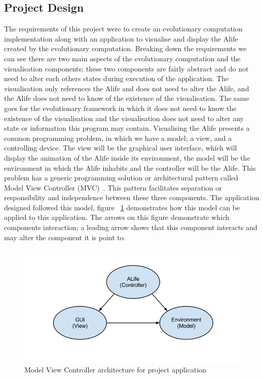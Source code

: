 \documentclass[12pt]{article}
\begin{document}
\subsection{Project Design}
The requirements of this project were to create an evolutionary computation implementation along with an application to visualise and
display the Alife created by the evolutionary computation. Breaking down the requirements we can see there are two main aspects
of the evolutionary computation and the visualisation components; these two components are fairly abstract and do not need to alter
each others states during execution of the application. The visualisation only references the Alife and does not need to alter
the Alife, and the Alife does not need to know of the existence of the visualisation. The same goes for the evolutionary framework
in which it does not need to know the existence of the visualisation and the visualisation does not need to alter any state or
information this program may contain. Visualising the Alife presents a common programming problem, in which we have a model; a view, and a controlling
device. The view will be the graphical user interface, which will display the animation of the Alife inside its environment, the 
model will be the environment in which the Alife inhabits and the controller will be the Alife. This problem has a generic programming
solution or architectural pattern called Model View Controller (MVC)~\cite{fowler03}. This pattern facilitates separation or responsibility
and independence between these three components. The application designed followed this model, figure ~\ref{fig:mvc} demonstrates 
how this model can be applied to this application. The arrows on this figure demonstrate which components interaction; a leading arrow
shows that this component interacts and may alter the component it is point to.

\begin{figure} [ht]
\centering
\includegraphics[scale = 0.5]{mvc.png}
\caption{Model View Controller architecture for project application}
\label{fig:mvc}
\end{figure}
\end{document}
